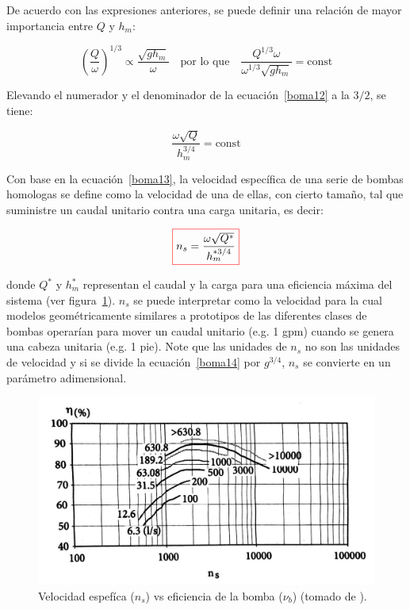 \documentclass[11pt, oneside]{article}
\begin{document}
De acuerdo con las expresiones anteriores, se puede definir una relaci\'on de mayor importancia entre $Q$ y $h_m$:

\begin{equation}
\left( \frac{Q}{\omega} \right)^{1/3} \propto \frac{\sqrt{g h_m}}{\omega} \quad \text{por lo que} \quad \frac{Q^{1/3} \omega}{\omega^{1/3} \sqrt{g h_m}} = \text{const}
\label{boma12}
\end{equation}

Elevando el numerador y el denominador de la ecuaci\'on~\ref{boma12} a la $3/2$, se tiene:

\begin{equation}
 \frac{\omega \sqrt{Q}}{ h_m^{3/4}} = \text{const}
\label{boma13}
\end{equation}

Con base en la ecuaci\'on~\ref{boma13}, la velocidad espec\'ifica de una serie de bombas homologas se define como la velocidad de una de ellas, con cierto tama\~no, tal que suministre un caudal unitario contra una carga unitaria, es decir:

\begin{equation}
\color{red}\boxed{\color{black} n_s= \frac{\omega \sqrt{Q^*} }{ h_m^{*3/4}} }
\label{boma14}
\end{equation}

donde $Q^*$ y $h_m^*$ representan el caudal y la carga para una eficiencia m\'axima del sistema (ver figura~\ref{bom11}). $n_s$ se puede interpretar como la velocidad para la cual modelos geom\'etricamente similares a prototipos de las diferentes clases de bombas operar\'ian para mover un caudal unitario (e.g. 1 gpm) cuando se genera una cabeza unitaria (e.g. 1 pie). Note que las unidades de $n_s$ no son las unidades de velocidad y si se divide la ecuaci\'on~\ref{boma14} por $g^{3/4}$, $n_s$ se convierte en un par\'ametro adimensional.

\begin{figure}[h]
\centering
\includegraphics[width=12cm]{./figs/bom11.jpeg}
\caption{Velocidad espef\'ica ($n_s$) vs eficiencia de la bomba ($\nu_b$)  (tomado de \cite{agudelo2011mecanica}).} 
\label{bom11}
\end{figure}
\end{document}
